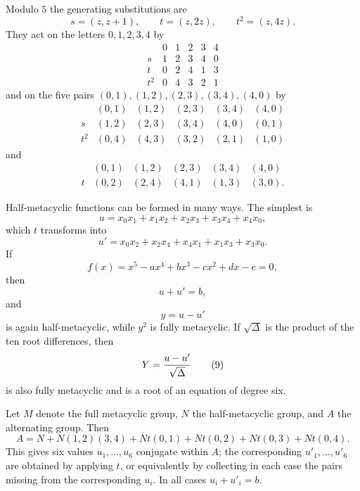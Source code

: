 \documentclass[11pt]{article}
\begin{document}
Modulo $5$ the generating substitutions are
\[
  s=(z,z+1),\qquad t=(z,2z),\qquad t^2=(z,4z).
\]
They act on the letters $0,1,2,3,4$ by
\[
\begin{array}{c|ccccc}
     &0&1&2&3&4\\ \hline
s    &1&2&3&4&0\\
t    &0&2&4&1&3\\
t^2  &0&4&3&2&1
\end{array}                                                       \tag{1}
\]
and on the five pairs $(0,1),(1,2),(2,3),(3,4),(4,0)$ by
\[
\begin{array}{c|ccccc}
      &(0,1)&(1,2)&(2,3)&(3,4)&(4,0)\\ \hline
s     &(1,2)&(2,3)&(3,4)&(4,0)&(0,1)\\
t^2   &(0,4)&(4,3)&(3,2)&(2,1)&(1,0)
\end{array}                                                       \tag{2}
\]
and
\[
\begin{array}{c|ccccc}
      &(0,1)&(1,2)&(2,3)&(3,4)&(4,0)\\ \hline
t     &(0,2)&(2,4)&(4,1)&(1,3)&(3,0).
\end{array}                                                       \tag{3}
\]

Half-metacyclic functions can be formed in many ways. The simplest is
\[
  u=x_0x_1+x_1x_2+x_2x_3+x_3x_4+x_4x_0,                         \tag{4}
\]
which $t$ transforms into
\[
  u'=x_0x_2+x_2x_4+x_4x_1+x_1x_3+x_3x_0.                         \tag{5}
\]
If
\[
  f(x)=x^5-ax^4+bx^3-cx^2+dx-e=0,                                \tag{6}
\]
then
\[
  u+u'=b,                                                         \tag{7}
\]
and
\[
  y=u-u'                                                          \tag{8}
\]
is again half-metacyclic, while $y^2$ is fully metacyclic. If $\sqrt\Delta$ is the product of the ten root differences, then
\[
  Y={u-u'\over\sqrt\Delta}                                       \tag{9}
\]
is also fully metacyclic and is a root of an equation of degree six.

Let $M$ denote the full metacyclic group, $N$ the half-metacyclic group, and $A$ the alternating group. Then
\[
 A=N+N(1,2)(3,4)+Nt(0,1)+Nt(0,2)+Nt(0,3)+Nt(0,4).                \tag{10}
\]
This gives six values $u_1,\ldots,u_6$ conjugate within $A$; the corresponding $u'_1,\ldots,u'_6$ are obtained by applying $t$, or equivalently by collecting in each case the pairs missing from the corresponding $u_i$. In all cases $u_i+u'_i=b$.
\end{document}
